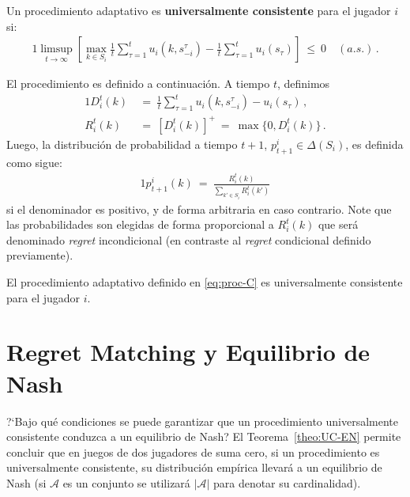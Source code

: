 \begin{definition}
\label{def:proc-univ-consistente}
Un procedimiento adaptativo es \textbf{universalmente consistente} para el jugador $i$ si:
\begin{alignat}{1}
	\limsup_{t \rightarrow \infty } \left[ \max_{k \in S_i} \frac{1}{t} \sum_{\tau = 1}^{t} u_i(k, s_{-i}^{\tau}) - \frac{1}{t} \sum_{\tau = 1}^{t} u_i(s_{\tau}) \right]\ \leq\ 0\quad (a. s.) \,.
\end{alignat}
\end{definition}
El procedimiento es definido a continuación. A tiempo $t$, definimos
\begin{alignat}{1}
D_i^t(k)\ &=\ \frac{1}{t} \sum_{\tau = 1}^{t} u_i(k, s_{-i}^{\tau}) - u_i(s_{\tau}) \,, \\
\label{eq:diferencia-pago-ri}
R_i^t(k)\ &=\ [D_i^t(k)]^+\ =\ \max\{0, D_i^t(k)\} \,.
\end{alignat}
Luego, la distribución de probabilidad a tiempo $t+1$, $p_{t+1}^i \in \Delta(S_i)$, es definida como sigue:
\begin{alignat}{1}
\label{eq:proc-C}
  p_{t+1}^i(k)\ =\ \frac{R_i^t(k)}{\sum_{k'\in S_i} R_i^t(k')}
\end{alignat}
si el denominador es positivo, y de forma arbitraria en caso contrario. Note que las probabilidades son elegidas de forma proporcional a $R_i^t(k)$ que será denominado \textit{regret} incondicional (en contraste al \textit{regret} condicional definido previamente).

\begin{theorem}
\label{theo:conv-proc-C}
El procedimiento adaptativo definido en \eqref{eq:proc-C} es universalmente consistente para el jugador $i$.
\end{theorem}

\section{Regret Matching y Equilibrio de Nash}

?`Bajo qué condiciones se puede garantizar que un procedimiento universalmente consistente conduzca a un equilibrio de Nash? El Teorema~\ref{theo:UC-EN} permite concluir que en juegos de dos jugadores de suma cero, si un procedimiento es universalmente consistente, su distribución empírica llevará a un equilibrio de Nash (si $\mathcal{A}$ es un conjunto se utilizará $|\mathcal{A}|$ para denotar su cardinalidad).


